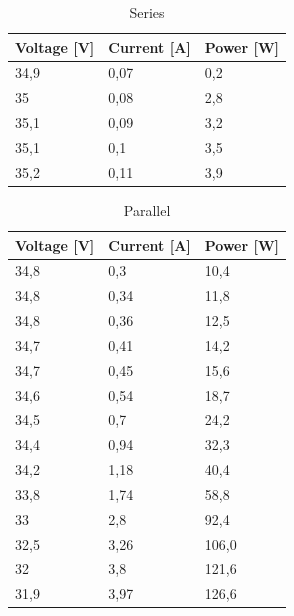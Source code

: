 \documentclass[12pt]{article}
\begin{document}
\begin{table}[!h]
	\centering
	\begin{tabular}{|p{2cm}|p{2cm}|p{2cm}|}
		\hline
		\rowcolor{Green!80} Voltage [V]  & Current [A] & Power [W] \\
		\hline
		\rowcolor{LimeGreen!70}    34,9  & 0,07        & 0,2       \\
		\hline
		\rowcolor{YellowGreen!70}   35   & 0,08        & 2,8       \\
		\hline
		\rowcolor{LimeGreen!70}    35,1  & 0,09        & 3,2       \\
		\hline
		\rowcolor{YellowGreen!70}   35,1 & 0,1         & 3,5       \\
		\hline
		\rowcolor{LimeGreen!70}     35,2 & 0,11        & 3,9       \\
		\hline
	\end{tabular}
	\caption{Series}
	\label{tab:my_label}
\end{table}

\begin{table}[!h]
	\centering
	\begin{tabular}{|p{2cm}|p{2cm}|p{2cm}|}
		\hline
		\rowcolor{RedOrange!80} Voltage [V] & Current [A] & Power [W] \\
		\hline
		\rowcolor{Peach!70}       34,8      & 0,3         & 10,4      \\
		\hline
		\rowcolor{Melon!70}        34,8     & 0,34        & 11,8      \\
		\hline
		\rowcolor{Peach!70}         34,8    & 0,36        & 12,5      \\
		\hline
		\rowcolor{Melon!70}        34,7     & 0,41        & 14,2      \\
		\hline
		\rowcolor{Peach!70}        34,7     & 0,45        & 15,6      \\
		\hline
		\rowcolor{Melon!70}          34,6   & 0,54        & 18,7      \\
		\hline
		\rowcolor{Peach!70}         34,5    & 0,7         & 24,2      \\
		\hline
		\rowcolor{Melon!70}          34,4   & 0,94        & 32,3      \\
		\hline
		\rowcolor{Peach!70}           34,2  & 1,18        & 40,4      \\
		\hline
		\rowcolor{Melon!70}         33,8    & 1,74        & 58,8      \\
		\hline
		\rowcolor{Peach!70}           33    & 2,8         & 92,4      \\
		\hline
		\rowcolor{Melon!70}           32,5  & 3,26        & 106,0     \\
		\hline
		\rowcolor{Peach!70}           32    & 3,8         & 121,6     \\
		\hline
		\rowcolor{Melon!70}           31,9  & 3,97        & 126,6     \\
		\hline
	\end{tabular}
	\caption{Parallel}
	\label{tab:my_label}
\end{table}
\end{document}
